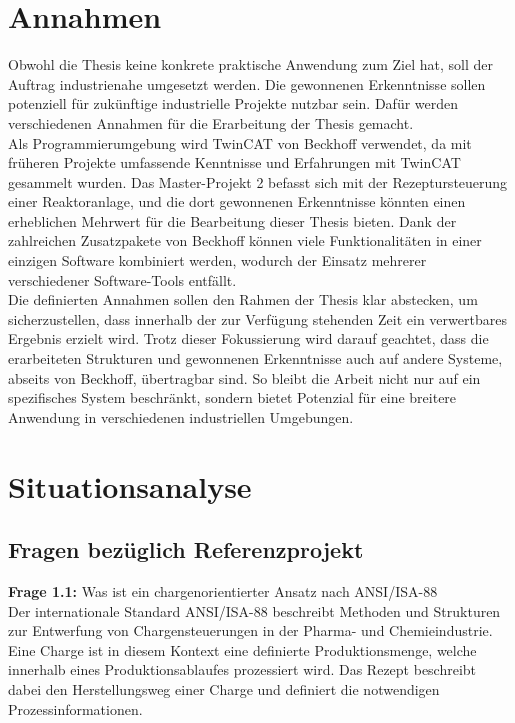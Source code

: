 \section{Annahmen} \label{Annahmen}
	Obwohl die Thesis keine konkrete praktische Anwendung zum Ziel hat, soll der Auftrag industrienahe umgesetzt werden. Die gewonnenen Erkenntnisse sollen potenziell für zukünftige industrielle Projekte nutzbar sein. Dafür werden verschiedenen Annahmen für die Erarbeitung der Thesis gemacht. 
	\\
	Als Programmierumgebung wird TwinCAT von Beckhoff verwendet, da mit früheren Projekte umfassende Kenntnisse und Erfahrungen mit TwinCAT gesammelt wurden. Das Master-Projekt 2 befasst sich mit der Rezeptursteuerung einer Reaktoranlage, und die dort gewonnenen Erkenntnisse könnten einen erheblichen Mehrwert für die Bearbeitung dieser Thesis bieten. Dank der zahlreichen Zusatzpakete von Beckhoff können viele Funktionalitäten in einer einzigen Software kombiniert werden, wodurch der Einsatz mehrerer verschiedener Software-Tools entfällt.
	\\ 
	Die definierten Annahmen sollen den Rahmen der Thesis klar abstecken, um sicherzustellen, dass innerhalb der zur Verfügung stehenden Zeit ein verwertbares Ergebnis erzielt wird. Trotz dieser Fokussierung wird darauf geachtet, dass die erarbeiteten Strukturen und gewonnenen Erkenntnisse auch auf andere Systeme, abseits von Beckhoff, übertragbar sind. So bleibt die Arbeit nicht nur auf ein spezifisches System beschränkt, sondern bietet Potenzial für eine breitere Anwendung in verschiedenen industriellen Umgebungen.
	

\section{Situationsanalyse} \label{Situationsanalyse}

	\subsection{Fragen bezüglich Referenzprojekt} \label{Fragen bezüglich Referenzprojekt}
	
	\textbf{Frage 1.1:} Was ist ein chargenorientierter Ansatz nach ANSI/ISA-88 \vspace{2mm} 
	\\
		Der internationale Standard ANSI/ISA-88 beschreibt Methoden und Strukturen zur Entwerfung von Chargensteuerungen in der Pharma- und Chemieindustrie. Eine Charge ist in diesem Kontext eine definierte Produktionsmenge, welche innerhalb eines Produktionsablaufes prozessiert wird.  Das Rezept beschreibt dabei den Herstellungsweg einer Charge und definiert die notwendigen Prozessinformationen. 
		
